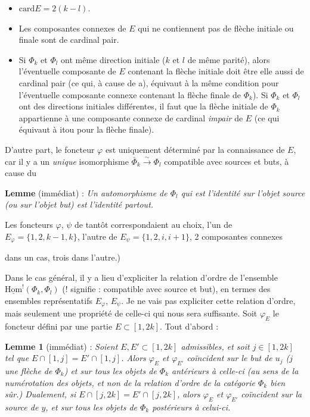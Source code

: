 \documentclass[11pt]{article}
\newcommand{\printedpage}[1]{\marginpar{\footnotesize p.~#1}}
\newcommand{\msp}[1]{\marginpar{\footnotesize [#1]}}
\newcommand{\uHom}{\underline{\mathrm{Hom}}}
\newcommand{\card}{\mathrm{card}}
\begin{document}
\begin{itemize}
\item[a)] $\card E=2(k-l)$.
\item[b)] Les composantes connexes de $E$ qui ne contiennent pas de flèche initiale ou finale sont de cardinal pair.
\item[c)] Si $\Phi_k$ et $\Phi_l$ ont même direction initiale ($k$ et $l$ de même parité), alors l'éventuelle composante de $E$ contenant la flèche initiale doit être elle aussi de cardinal pair (ce qui, à cause de a), équivaut à la même condition pour l'éventuelle composante connexe contenant la flèche finale de $\Phi_k$). Si $\Phi_k$ et $\Phi_l$ ont des directions initiales différentes, il faut que la flèche initiale de $\Phi_k$ appartienne à une composante connexe de cardinal \textit{impair} de $E$ (ce qui équivaut à itou pour la flèche finale).
\end{itemize}

D'autre part, le foncteur $\varphi$ est uniquement déterminé par la connaissance de $E$, car il y a un \textit{unique} isomorphisme $\bar{\Phi}_k\xrightarrow{\sim}\Phi_l$ compatible avec sources et buts, à cause du

\textbf{Lemme} (immédiat) : \textit{Un automorphisme de $\Phi_l$ qui est l'identité sur l'objet source (ou sur l'objet but) est l'identité partout.}

Les foncteurs $\varphi$, $\psi$ de tantôt correspondaient au choix, l'un de $E_\varphi=\{1,2,k-1,k\}$, l'autre de $E_\psi=\{1,2,i,i+1\}$, 2 composantes connexes

\msp{page 20}
dans un cas, trois dans l'autre.) %


\printedpage{13}

Dans le cas général, il y a lieu d'expliciter la relation d'ordre de l'ensemble $\uHom^{!}(\Phi_k,\Phi_l)$ (! signifie : compatible avec source et but), en termes des ensembles représentatifs $E_\varphi$, $E_\psi$. Je ne vais pas expliciter cette relation d'ordre, mais seulement une propriété de celle-ci qui nous sera suffisante. Soit $\varphi_E$ le foncteur défini par une partie $E\subset[1,2k]$. Tout d'abord :

\textbf{Lemme 1} (immédiat) : \textit{Soient $E,E'\subset[1,2k]$ admissibles, et soit $j\in[1,2k]$ tel que $E\cap[1,j]=E'\cap[1,j]$. Alors $\varphi_E$ et $\varphi_{E'}$ coïncident sur le but de $u_j$ ($j$ une flèche de $\Phi_k$) et sur tous les objets de $\Phi_k$ antérieurs à celle-ci (au sens de la numérotation des objets, et non de la relation d'ordre de la catégorie $\Phi_k$ bien sûr.) Dualement, si $E\cap[j,2k]=E'\cap[j,2k]$, alors $\varphi_E$ et $\varphi_{E'}$ coïncident sur la source de $y$, et sur tous les objets de $\Phi_k$ postérieurs à celui-ci.} %
\end{document}
